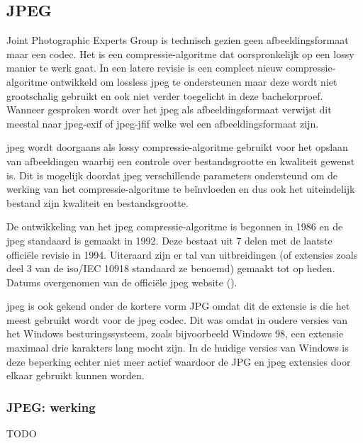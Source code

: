 \subsection{JPEG}
\label{sec:afbeeldingscompressie-jpeg}

Joint Photographic Experts Group is technisch gezien geen \gls{afbeeldingsformaat} maar een \gls{codec}. Het is een \gls{compressie-algoritme} dat oorspronkelijk op een \gls{lossy} manier te werk gaat. In een latere revisie is een compleet nieuw \gls{compressie-algoritme} ontwikkeld om \gls{lossless} \gls{jpeg} te ondersteunen maar deze wordt niet grootschalig gebruikt en ook niet verder toegelicht in deze bachelorproef. Wanneer gesproken wordt over het \gls{jpeg} als \gls{afbeeldingsformaat} verwijst dit meestal naar \gls{jpeg-exif} of \gls{jpeg-jfif} welke wel een \gls{afbeeldingsformaat} zijn.

\gls{jpeg} wordt doorgaans als \gls{lossy} \gls{compressie-algoritme} gebruikt voor het opslaan van afbeeldingen waarbij een controle over bestandsgrootte en kwaliteit gewenst is. Dit is mogelijk doordat \gls{jpeg} verschillende parameters ondersteund om de werking van het \gls{compressie-algoritme} te beïnvloeden en dus ook het uiteindelijk bestand zijn kwaliteit en bestandsgrootte.

De ontwikkeling van het \gls{jpeg} \gls{compressie-algoritme} is begonnen in 1986 en de \gls{jpeg} standaard is gemaakt in 1992. Deze bestaat uit 7 delen met de laatste officiële revisie in 1994. Uiteraard zijn er tal van uitbreidingen (of extensies zoals deel 3 van de \gls{iso}/IEC 10918 standaard ze benoemd) gemaakt tot op heden. Datums overgenomen van de officiële \gls{jpeg} website (\cite{jpegorg}). 

\gls{jpeg} is ook gekend onder de kortere vorm JPG omdat dit de extensie is die het meest gebruikt wordt voor de \gls{jpeg} \gls{codec}. Dit was omdat in oudere versies van het Windows besturingssysteem, zoals bijvoorbeeld Windows 98, een \gls{extensie} maximaal drie karakters lang mocht zijn. In de huidige versies van Windows is deze beperking echter niet meer actief waardoor de JPG en \gls{jpeg} \glspl{extensie} door elkaar gebruikt kunnen worden.

\subsubsection{JPEG: werking}
\label{sec:afbeeldingscompressie-jpeg-werking}

TODO

